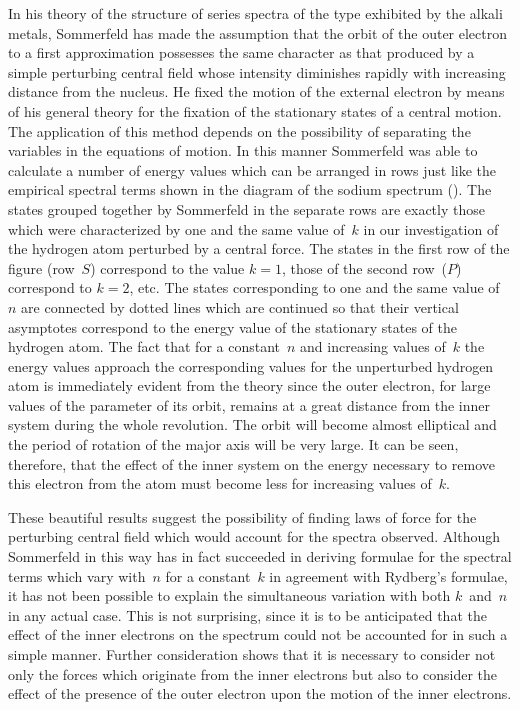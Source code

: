 In his theory of the structure of series spectra of the type exhibited
by the alkali metals, Sommerfeld has made the assumption
that the orbit of the outer electron to a first approximation possesses
the same character as that produced by a simple perturbing
central field whose intensity diminishes rapidly with increasing
distance from the nucleus. He fixed the motion of the external
electron by means of his general theory for the fixation of the
stationary states of a central motion. The application of this
method depends on the possibility of separating the variables in
the equations of motion. In this manner Sommerfeld was able to
calculate a number of energy values which can be arranged in rows
just like the empirical spectral terms shown in the diagram of the
sodium spectrum (). The states grouped together by Sommerfeld
in the separate rows are exactly those which were characterized
by one and the same value of~$k$ in our investigation of the
hydrogen atom perturbed by a central force. The states in the
first row of the figure (row~$S$) correspond to the value $k = 1$, those
of the second row~($P$) correspond to $k = 2$, etc. The states corresponding
to one and the same value of~$n$ are connected by dotted
lines which are continued so that their vertical asymptotes correspond
to the energy value of the stationary states of the hydrogen
atom. The fact that for a constant~$n$ and increasing values of~$k$
the energy values approach the corresponding values for the unperturbed
hydrogen atom is immediately evident from the theory
since the outer electron, for large values of the parameter of its
orbit, remains at a great distance from the inner system during the
whole revolution. The orbit will become almost elliptical and the
period of rotation of the major axis will be very large. It can be
seen, therefore, that the effect of the inner system on the energy
necessary to remove this electron from the atom must become less
for increasing values of~$k$.

These beautiful results suggest the possibility of finding laws of
force for the perturbing central field which would account for the
spectra observed. Although Sommerfeld in this way has in fact
succeeded in deriving formulae for the spectral terms which vary
with~$n$ for a constant~$k$ in agreement with Rydberg's formulae, it
has not been possible to explain the simultaneous variation with
both $k$~and~$n$ in any actual case. This is not surprising, since it is
to be anticipated that the effect of the inner electrons on the spectrum
could not be accounted for in such a simple manner. Further
consideration shows that it is necessary to consider not only the
forces which originate from the inner electrons but also to consider
the effect of the presence of the outer electron upon the motion of
the inner electrons.

